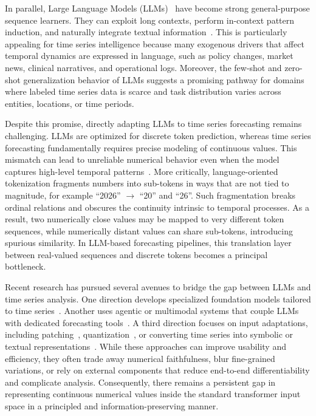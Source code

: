 \documentclass{article}
\begin{document}
In parallel, Large Language Models (LLMs)~\cite{GPT-4} have become strong general-purpose sequence learners.  They can exploit long contexts, perform in-context pattern induction, and naturally integrate textual information~\cite{hu2025contextalignment,zhou2025can,zhang2024guiding}.  This is particularly appealing for time series intelligence because many exogenous drivers that affect temporal dynamics are expressed in language, such as policy changes, market news, clinical narratives, and operational logs.  Moreover, the few-shot and zero-shot generalization behavior of LLMs suggests a promising pathway for domains where labeled time series data is scarce and task distribution varies across entities, locations, or time periods.

Despite this promise, directly adapting LLMs to time series forecasting remains challenging.  LLMs are optimized for discrete token prediction, whereas time series forecasting fundamentally requires precise modeling of continuous values.  This mismatch can lead to unreliable numerical behavior even when the model captures high-level temporal patterns~\cite{merrill2024language,ye2025llm}.  More critically, language-oriented tokenization fragments numbers into sub-tokens in ways that are not tied to magnitude, for example ``2026'' $\rightarrow$ ``20'' and ``26''.  Such fragmentation breaks ordinal relations and obscures the continuity intrinsic to temporal processes.  As a result, two numerically close values may be mapped to very different token sequences, while numerically distant values can share sub-tokens, introducing spurious similarity.  In LLM-based forecasting pipelines, this translation layer between real-valued sequences and discrete tokens becomes a principal bottleneck.

Recent research has pursued several avenues to bridge the gap between LLMs and time series analysis.  One direction develops specialized foundation models tailored to time series~\cite{cao2026pinfdit,cao2023tempo}.  Another uses agentic or multimodal systems that couple LLMs with dedicated forecasting tools~\cite{ye2024beyond,anonymous2026someone}.  A third direction focuses on input adaptations, including patching~\cite{Yuqietal-2023-PatchTST}, quantization~\cite{talukdertotem}, or converting time series into symbolic or textual representations~\cite{GPT4MTS}.  While these approaches can improve usability and efficiency, they often trade away numerical faithfulness, blur fine-grained variations, or rely on external components that reduce end-to-end differentiability and complicate analysis.  Consequently, there remains a persistent gap in representing continuous numerical values inside the standard transformer input space in a principled and information-preserving manner.
\end{document}
